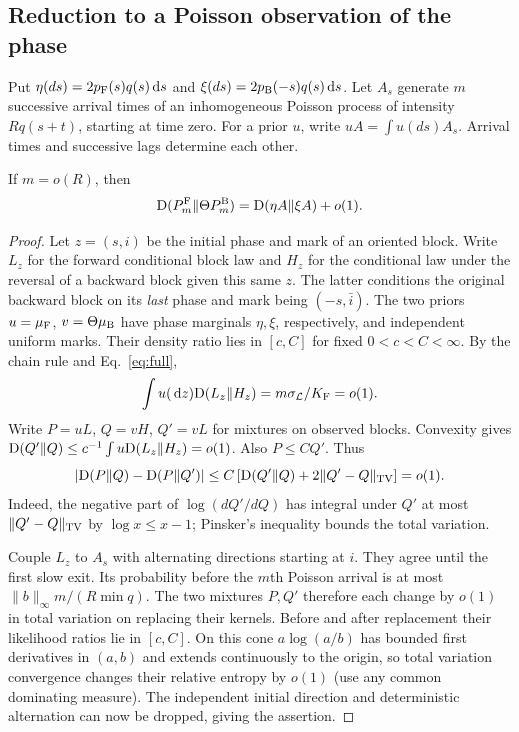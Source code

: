 \subsection{Reduction to a Poisson observation of the phase}
Put $\eta(ds)=2p_\mathrm F(s)q(s)\,\mathrm d s$ and $\xi(ds)=2p_\mathrm B(-s)q(s)\,\mathrm d s$.
Let $A_s$ generate $m$ successive arrival times of an inhomogeneous Poisson process of intensity $Rq(s+t)$, starting at time zero. For a prior $u$, write $uA=\int u(ds)A_s$. Arrival times and successive lags determine each other.
\begin{lemma}\label{lem:reduction}
If $m=o(R)$, then
\[
 \mathrm D(P_m^\mathrm F\|\Theta P_m^\mathrm B)=\mathrm D(\eta A\|\xi A)+o(1).
\]
\end{lemma}
\begin{proof}
Let $z=(s,i)$ be the initial phase and mark of an oriented block. Write $L_z$ for the forward conditional block law and $H_z$ for the conditional law under the reversal of a backward block given this same $z$. The latter conditions the original backward block on its \emph{last} phase and mark being $(-s,\bar i)$. The two priors $u=\mu_\mathrm F$, $v=\Theta\mu_\mathrm B$ have phase marginals $\eta,\xi$, respectively, and independent uniform marks. Their density ratio lies in $[c,C]$ for fixed $0<c<C<\infty$. By the chain rule and Eq.~\eqref{eq:full},
\[
 \int u(\,\mathrm d z)\mathrm D(L_z\|H_z)=m\sigma_{\mathcal L}/K_\mathrm F=o(1).
\]
Write $P=uL$, $Q=vH$, $Q'=vL$ for mixtures on observed blocks. Convexity gives $\mathrm D(Q'\|Q)\le c^{-1}\int u\mathrm D(L_z\|H_z)=o(1)$. Also $P\le C Q'$. Thus
\[
 |\mathrm D(P\|Q)-\mathrm D(P\|Q')|\le C\left[\mathrm D(Q'\|Q)+2\|Q'-Q\|_{\rm TV}\right]=o(1).
\]
Indeed, the negative part of $\log(dQ'/dQ)$ has integral under $Q'$ at most $\|Q'-Q\|_{\rm TV}$ by $\log x\le x-1$; Pinsker's inequality bounds the total variation.

Couple $L_z$ to $A_s$ with alternating directions starting at $i$. They agree until the first slow exit. Its probability before the $m$th Poisson arrival is at most $\|b\|_\infty m/(R\min q)$. The two mixtures $P,Q'$ therefore each change by $o(1)$ in total variation on replacing their kernels. Before and after replacement their likelihood ratios lie in $[c,C]$. On this cone $a\log(a/b)$ has bounded first derivatives in $(a,b)$ and extends continuously to the origin, so total variation convergence changes their relative entropy by $o(1)$ (use any common dominating measure). The independent initial direction and deterministic alternation can now be dropped, giving the assertion.
\end{proof}

